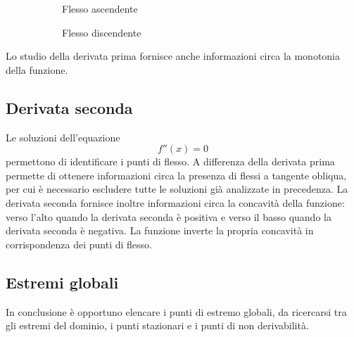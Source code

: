 \begin{figure}[ht]
\begin{subfigure}{0.24\textwidth}
            \caption{Flesso ascendente}
        \end{subfigure}
        \begin{subfigure}{0.24\textwidth}
            \centering
            \caption{Flesso discendente}
        \end{subfigure}
        \caption{}
    \end{figure}
    Lo studio della derivata prima fornisce anche informazioni circa la monotonia della funzione.
    \subsection{Derivata seconda}
    Le soluzioni dell'equazione \[f''(x)=0\] permettono di identificare i punti di flesso. A differenza della derivata prima permette di ottenere informazioni circa la presenza di flessi a tangente obliqua, per cui è necessario escludere tutte le soluzioni già analizzate in precedenza. 
    La derivata seconda fornisce inoltre informazioni circa la concavità della funzione: verso l'alto quando la derivata seconda è positiva e verso il basso quando la derivata seconda è negativa. La funzione inverte la propria concavità in corrispondenza dei punti di flesso.
    \subsection{Estremi globali}
    In conclusione è opportuno elencare i punti di estremo globali, da ricercarsi tra gli estremi del dominio, i punti stazionari e i punti di non derivabilità.

